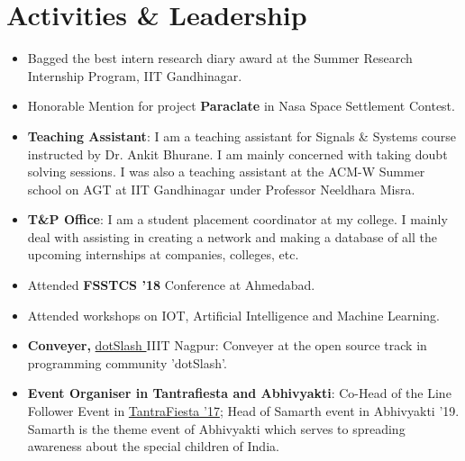 \documentclass[a4paper,10pt]{extarticle} %
\begin{document}
\section{\textcolor{primary}{Activities \& Leadership}}
\vspace{0.2cm}
\begin{itemize}[leftmargin=0.55cm, rightmargin=0.2cm, label={\Large\textbullet}]
\item Bagged the best intern research diary award at the Summer Research Internship Program, IIT Gandhinagar.
\vspace{-0.15cm}
\item Honorable Mention for project \textbf{Paraclate} in Nasa Space Settlement Contest.
\vspace{-0.15cm}
\item \textbf{Teaching Assistant}: I am a teaching assistant for Signals \& Systems course instructed by Dr. Ankit Bhurane. I am mainly concerned with taking doubt solving sessions. I was also a teaching assistant at the ACM-W Summer school on AGT at IIT Gandhinagar under Professor Neeldhara Misra.
\vspace{-0.15cm}
\item \textbf{T\&P Office}: I am a student placement coordinator at my college. I mainly deal with assisting in creating a network and making a database of all the upcoming internships at companies, colleges, etc.
\vspace{-0.15cm}
\item Attended \textbf{FSSTCS '18} Conference at Ahmedabad.
\vspace{-0.15cm}
\item Attended workshops on IOT, Artificial Intelligence and Machine Learning.
\vspace{-0.15cm}
\item \textbf{Conveyer, }\href{https://iiit-nagpur.github.io/website-PC/}{ dotSlash  }IIIT Nagpur: Conveyer at the open source track in programming community 'dotSlash'. %
\vspace{-0.15cm}
\item \textbf{Event Organiser in Tantrafiesta and Abhivyakti}: Co-Head of the Line Follower Event in \href{https://tantrafiesta.in}{TantraFiesta '17}; Head of Samarth event in Abhivyakti '19. Samarth is the theme event of Abhivyakti which serves to spreading awareness about the special children of India.
\end{itemize}
\vspace{0.3cm}
\end{document}
